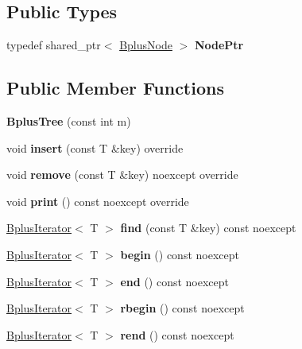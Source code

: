 \subsection*{Public Types}
\begin{DoxyCompactItemize}
\item 
\mbox{\label{classBplusTree_a4db76354142996b6c2e943e4bfe82c38}} 
typedef shared\+\_\+ptr$<$ \hyperlink{classBplusTree_1_1BplusNode}{Bplus\+Node} $>$ {\bfseries Node\+Ptr}
\end{DoxyCompactItemize}
\subsection*{Public Member Functions}
\begin{DoxyCompactItemize}
\item 
\mbox{\label{classBplusTree_a95dac42b6d93b4c41bfcd1aacac936d8}} 
{\bfseries Bplus\+Tree} (const int m)
\item 
\mbox{\label{classBplusTree_a706e3329120bd4f25ca0e9ff28eb7e32}} 
void {\bfseries insert} (const T \&key) override
\item 
\mbox{\label{classBplusTree_a7e63275f3226fe9bdb29a4bcbd938fb4}} 
void {\bfseries remove} (const T \&key) noexcept override
\item 
\mbox{\label{classBplusTree_ad1ae39510e9c7be66119d9387dfe30c5}} 
void {\bfseries print} () const noexcept override
\item 
\mbox{\label{classBplusTree_a367ff479947c9103abc781db035a49ee}} 
\hyperlink{classBplusIterator}{Bplus\+Iterator}$<$ T $>$ {\bfseries find} (const T \&key) const noexcept
\item 
\mbox{\label{classBplusTree_af25d2c310a013718a1d54e8993bf7b76}} 
\hyperlink{classBplusIterator}{Bplus\+Iterator}$<$ T $>$ {\bfseries begin} () const noexcept
\item 
\mbox{\label{classBplusTree_ac217ed576ff9495e2fd90f5d13f34065}} 
\hyperlink{classBplusIterator}{Bplus\+Iterator}$<$ T $>$ {\bfseries end} () const noexcept
\item 
\mbox{\label{classBplusTree_a96798aee453828de98c3eba8a6507915}} 
\hyperlink{classBplusIterator}{Bplus\+Iterator}$<$ T $>$ {\bfseries rbegin} () const noexcept
\item 
\mbox{\label{classBplusTree_a048e70503ad677508b75cb845d125b93}} 
\hyperlink{classBplusIterator}{Bplus\+Iterator}$<$ T $>$ {\bfseries rend} () const noexcept
\end{DoxyCompactItemize}

